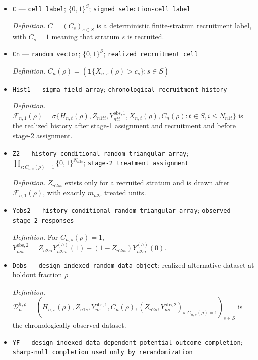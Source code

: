 \documentclass{article}
\begin{document}
\begin{itemize}
  \item \texttt{C} --- \texttt{cell label}; \(\{0,1\}^{S}\); \texttt{signed selection-\allowbreak{}cell label}
  \par\smallskip\noindent\emph{Definition.} \(C=(C_s)_{s\in S}\) is a deterministic finite-stratum recruitment label, with \(C_s=1\) meaning that stratum \(s\) is recruited.
  \item \texttt{Cn} --- \texttt{random vector}; \(\{0,1\}^{S}\); \texttt{realized recruitment cell}
  \par\smallskip\noindent\emph{Definition.} \(C_n(\rho)=(\mathbf{1}\{X_{n,s}(\rho)>c_s\}:s\in S)\)
  \item \texttt{Hist1} --- \texttt{sigma-\allowbreak{}field array}; \texttt{chronological recruitment history}
  \par\smallskip\noindent\emph{Definition.} \(\mathcal F_{n,1}(\rho)=\sigma\{H_{n,t}(\rho),Z_{n1ti},Y^{\mathrm{obs},1}_{nti},X_{n,t}(\rho),C_n(\rho):t\in S,i\le N_{n1t}\}\) is the realized history after stage-1 assignment and recruitment and before stage-2 assignment.
  \item \texttt{Z2} --- \texttt{history-\allowbreak{}conditional random triangular array}; \(\prod_{s:C_{n,s}(\rho)=1}\{0,1\}^{N_{n2s}}\); \texttt{stage-\allowbreak{}2 treatment assignment}
  \par\smallskip\noindent\emph{Definition.} \(Z_{n2si}\) exists only for a recruited stratum and is drawn after \(\mathcal F_{n,1}(\rho)\), with exactly \(m_{n2s}\) treated units.
  \item \texttt{Yobs2} --- \texttt{history-\allowbreak{}conditional random triangular array}; \texttt{observed stage-\allowbreak{}2 responses}
  \par\smallskip\noindent\emph{Definition.} For \(C_{n,s}(\rho)=1\), \(Y^{\mathrm{obs},2}_{nsi}=Z_{n2si}Y^{(h)}_{n2si}(1)+(1-Z_{n2si})Y^{(h)}_{n2si}(0)\).
  \item \texttt{Dobs} --- \texttt{design-\allowbreak{}indexed random data object}; realized alternative dataset at holdout fraction \(\rho\)
  \par\smallskip\noindent\emph{Definition.} \(\mathcal D_n^{h,\rho}=(H_{n,s}(\rho),Z_{n1s},Y^{\mathrm{obs},1}_{ns},C_n(\rho),(Z_{n2s},Y^{\mathrm{obs},2}_{ns})_{s:C_{n,s}(\rho)=1})_{s\in S}\) is the chronologically observed dataset.
  \item \texttt{YF} --- \texttt{design-\allowbreak{}indexed data-\allowbreak{}dependent potential-\allowbreak{}outcome completion}; \texttt{sharp-\allowbreak{}null completion used only by rerandomization}

\end{itemize}
\end{document}
